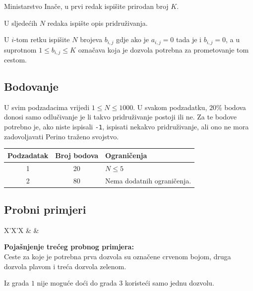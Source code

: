 \begin{statement}[
  problempoints=100,
  timelimit=1 sekunda,
  memorylimit=1024 MiB,
]{Ministarstvo}
Inače, u prvi redak ispišite prirodan broj $K$.

U sljedećih $N$ redaka ispište opis pridruživanja.

U $i$-tom retku ispišite $N$ brojeva $b_{i, j}$ gdje ako je $a_{i, j} = 0$ tada je i $b_{i, j} = 0$, a u suprotnom $1 \leq b_{i, j} \leq K$ označava koja je dozvola potrebna za prometovanje tom cestom. 

\subsection*{Bodovanje}

U svim podzadacima vrijedi $1 \leq N \leq 1000$. U svakom podzadatku, $20\%$ bodova donosi samo odlučivanje je li takvo pridruživanje postoji ili ne. Za te bodove potrebno je, ako niste ispisali \texttt{-1}, ispisati nekakvo pridruživanje, ali ono ne mora zadovoljavati Perino traženo svojstvo. 

{\renewcommand{\arraystretch}{1.4}
  \setlength{\tabcolsep}{6pt}
  \begin{tabular}{ccl}
   Podzadatak & Broj bodova & Ograničenja \\ \midrule
    1 & 20 & $N \leq 5$  \\
    2 & 80 & Nema dodatnih ograničenja. \\
\end{tabular}}

\subsection*{Probni primjeri}
\begin{tabularx}{\textwidth}{X'X'X}
 &
 &
\end{tabularx}

\textbf{Pojašnjenje trećeg probnog primjera:}\\

Ceste za koje je potrebna prva dozvola su označene crvenom bojom, druga dozvola plavom i treća dozvola zelenom. 

Iz grada $1$ nije moguće doći do grada $3$ koristeći samo jednu dozvolu.


\end{statement}
